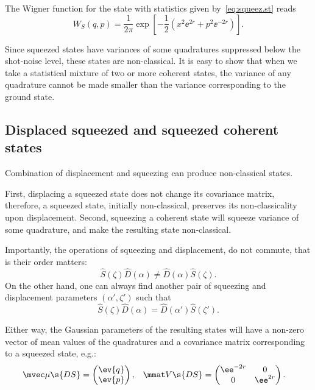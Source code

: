 \documentclass[fontsize=9pt,bookmarkpackage=false]{scrartcl}
\begin{document}
The Wigner function for the state with statistics given by~\cref{eq:squeez.st} reads
\begin{equation}
  W_S ( q , p ) = \frac{ 1 }{ 2 \pi }
  \exp \left[ - \frac 12
  \left( x^2 \ee^{ 2 r } + p^2 \ee^{ -2 r } \right) \right].
\end{equation}

Since squeezed states have variances of some quadratures suppressed below the shot-noise level, these states are non-classical.
It is easy to show that when we take a statistical mixture of two or more coherent states, the variance of any quadrature cannot be made smaller than the variance corresponding to the ground state.

\subsection{Displaced squeezed and squeezed coherent states} %
\label{sec:displaced_squeezed_states}

Combination of displacement and squeezing can produce non-classical states.

First, displacing a squeezed state does not change its covariance matrix, therefore, a squeezed state, initially non-classical, preserves its non-classicality upon displacement.
Second, squeezing a coherent state will squeeze variance of some quadrature, and make the resulting state non-classical.

Importantly, the operations of squeezing and displacement, do not commute, that is their order matters:
\begin{equation}
  \hat S ( \zeta ) \hat D ( \alpha )  \neq \hat D (\alpha ) \hat S ( \zeta ).
\end{equation}
On the other hand, one can always find another pair of squeezing and displacement parameters $(\alpha', \zeta')$ such that
\begin{equation}
  \hat S ( \zeta ) \hat D ( \alpha ) = \hat D (\alpha' ) \hat S ( \zeta' ).
\end{equation}

Either way, the Gaussian parameters of the resulting states will have a non-zero vector of mean values of the quadratures and a covariance matrix corresponding to a squeezed state, e.g.:
\begin{align}
  \mvec \mu\s{DS} & =
  \begin{pmatrix}
    \ev{q} \\ \ev{ p}
  \end{pmatrix},
  &
  \mmat V\s{DS} & =
  \begin{pmatrix}
    \ee^{ - 2 r } & 0
    \\
    0 & \ee^{ 2 r }
  \end{pmatrix}.
\end{align}
\end{document}
